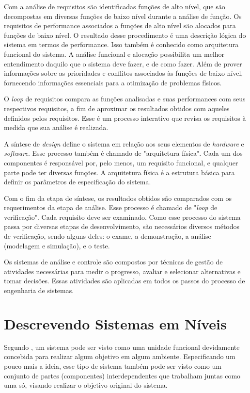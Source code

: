     Com a análise de requisitos são identificadas funções de alto nível, que são decompostas em diversas funções de baixo nível durante a análise de função. Os requisitos de performance associados a funções de alto nível são alocados para funções de baixo nível. O resultado desse procedimento é uma descrição lógica do sistema em termos de performance. Isso também é conhecido como arquitetura funcional do sistema. A análise funcional e alocação possibilita um melhor entendimento daquilo que o sistema deve fazer, e de como fazer. Além de prover informações sobre as prioridades e conflitos associados às funções de baixo nível, fornecendo informações essenciais para a otimização de problemas físicos.
    
    O \textit{loop} de requisitos compara as funções analisadas e suas performances com seus respectivos requisitos, a fim de aproximar os resultados obtidos com aqueles definidos pelos requisitos. Esse é um processo interativo que revisa os requisitos à medida que sua análise é realizada. 
    
    A síntese de \textit{design} define o sistema em relação aos seus elementos de \textit{hardware} e \textit{software}. Esse processo também é chamado de "arquitetura física". Cada um dos componentes é responsável por, pelo menos, um requisito funcional, e qualquer parte pode ter diversas funções. A arquitetura física é a estrutura básica para definir os parâmetros de especificação do sistema.

    Com o fim da etapa de síntese, os resultados obtidos são comparados com os requerimentos da etapa de análise. Esse processo é chamado de "\textit{loop} de verificação". Cada requisito deve ser examinado. Como esse processo do sistema passa por diversas etapas de desenvolvimento, são necessários diversos métodos de verificação, sendo alguns deles: o exame, a demonstração, a análise (modelagem e simulação), e o teste.
    
    Os sistemas de análise e controle são compostos por técnicas de gestão de atividades necessárias para medir o progresso, avaliar e selecionar alternativas e tomar decisões. Essas atividades são aplicadas em todos os passos do processo de engenharia de sistemas.

\section{Descrevendo Sistemas em Níveis}
\label{sec:abord-def-nivel}

    Segundo , um sistema pode ser visto como uma unidade funcional devidamente concebida para realizar algum objetivo em algum ambiente. Especificando um pouco mais a ideia, esse tipo de sistema também pode ser visto como um conjunto de partes (componentes) interdependentes que trabalham juntas como uma só, visando realizar o objetivo original do sistema.%
    
